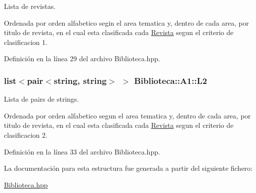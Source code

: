 Lista de revistas. 

Ordenada por orden alfabetico segin el area tematica y, dentro de cada area, por titulo de revista, en el cual esta clasificada cada \hyperlink{class_revista}{Revista} segun el criterio de clasificacion 1. 

Definición en la línea 29 del archivo Biblioteca.\-hpp.

\hypertarget{struct_biblioteca_1_1_a1_a8463b0647409ec910cfdbf7fdaaa86b2}{
\subsubsection[{L2}]{\setlength{\rightskip}{0pt plus 5cm}list$<$pair$<$string, string$>$ $>$ Biblioteca\-::\-A1\-::\-L2}}\label{struct_biblioteca_1_1_a1_a8463b0647409ec910cfdbf7fdaaa86b2}


Lista de pairs de strings. 

Ordenada por orden alfabetico segun el area tematica y, dentro de cada area, por titulo de revista, en el cual esta clasificada cada \hyperlink{class_revista}{Revista} segun el criterio de clasificacion 2. 

Definición en la línea 33 del archivo Biblioteca.\-hpp.



La documentación para esta estructura fue generada a partir del siguiente fichero\-:\begin{DoxyCompactItemize}
\item 
\hyperlink{_biblioteca_8hpp}{Biblioteca.\-hpp}\end{DoxyCompactItemize}
